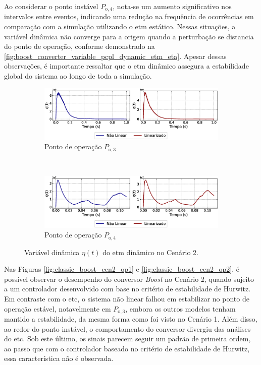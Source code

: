Ao considerar o ponto instável $P_{\mathrm{o}, 4}$, nota-se um aumento significativo nos intervalos entre eventos, indicando uma redução na frequência de ocorrências em comparação com a simulação utilizando o \acrshort{etm} estático. Nessas situações, a variável dinâmica não converge para a origem quando a perturbação se distancia do ponto de operação, conforme demonstrado na \autoref{fig:boost_converter_variable_pcpl_dynamic_etm_eta}. Apesar dessas observações, é importante ressaltar que o \acrshort{etm} dinâmico assegura a estabilidade global do sistema ao longo de toda a simulação.

\begin{figure}[H]
  \centering
  \captionsetup{justification=centering}
  \begin{subfigure}{1.\textwidth}
    \centering
    \includegraphics[width=1.\textwidth]{figuras/dynamic-etm/boost/sim2/op1/eta.eps}
    \caption{Ponto de operação $P_{\mathrm{o}, 3}$}
  \end{subfigure}
  \\[6pt]
  \begin{subfigure}{1.\textwidth}
    \centering
    \includegraphics[width=1.\textwidth]{figuras/dynamic-etm/boost/sim2/op2/eta.eps}
    \caption{Ponto de operação $P_{\mathrm{o}, 4}$}
  \end{subfigure}
  \caption{Variável dinâmica $\eta(t)$ do \acrshort{etm} dinâmico no Cenário 2.}
  \label{fig:boost_converter_variable_pcpl_dynamic_etm_eta}
\end{figure}

Nas Figuras \ref{fig:classic_boost_cen2_op1} e \ref{fig:classic_boost_cen2_op2}, é possível observar o desempenho do conversor \textit{Boost }no Cenário 2, quando sujeito a um controlador desenvolvido com base no critério de estabilidade de Hurwitz. Em contraste com o \acrshort{etc}, o sistema não linear falhou em estabilizar no ponto de operação estável, notavelmente em $P_{\mathrm{o}, 3}$, embora os outros modelos tenham mantido a estabilidade, da mesma forma como foi visto no Cenário 1. Além disso, ao redor do ponto instável, o comportamento do conversor divergiu das análises do \acrshort{etc}. Sob este último, os sinais parecem seguir um padrão de primeira ordem, ao passo que com o controlador baseado no critério de estabilidade de Hurwitz, essa característica não é observada.

